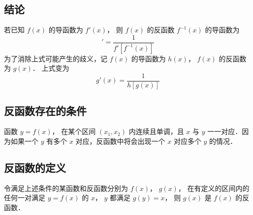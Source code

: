 

\subsection{结论}
若已知 $f(x)$ 的导函数为 $f'(x)$， 则 $f(x)$ 的反函数 ${f^{ - 1}}(x)$ 的导函数为
\begin{equation}
[{f^{ - 1}}(x)]' = \frac{1}{f'[f^{ - 1}(x)]} 
\end{equation} 
为了消除上式可能产生的歧义，记 $f(x)$ 的导函数为 $h(x)$，  $f(x)$ 的反函数为 $g(x)$． 上式变为
 \begin{equation}
g'(x) = \frac{1}{h[g(x)]}
\end{equation}
\subsection{反函数存在的条件}
函数 $y = f(x)$， 在某个区间 $(x_1, x_2)$ 内连续且单调，且 $x$ 与 $y$ 一一对应．因为如果一个 $y$ 有多个 $x$ 对应，反函数中将会出现一个 $x$ 对应多个 $y$ 的情况．
\subsection{反函数的定义}
令满足上述条件的某函数和反函数分别为 $f(x)$，  $g(x)$， 在有定义的区间内的任何一对满足 $y = f(x)$ 的 $x$，  $y$ 都满足 $g(y) = x$， 则 $g(x)$ 是 $f(x)$ 的反函数．

